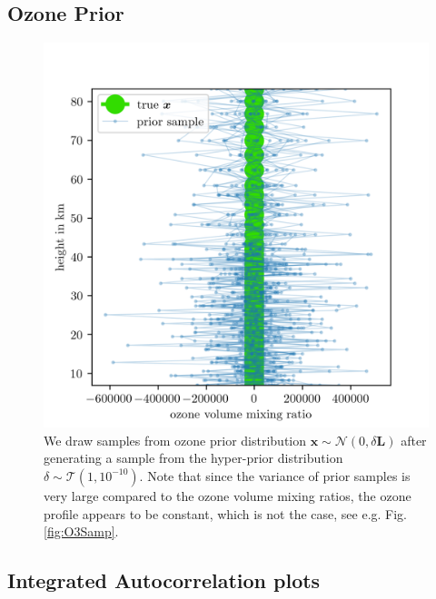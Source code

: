 \subsection{Ozone Prior}
\begin{figure}[ht!]
	\centering
	\includegraphics{OzonePrior.png}
	\caption[Samples from ozone prior distribution.]{We draw samples from ozone prior distribution $\bm{x} \sim \mathcal{N}(0,\delta \bm{L})$ after generating a sample from the hyper-prior distribution $\delta \sim \mathcal{T}(1,10^{-10})$. Note that since the variance of prior samples is very large compared to the ozone volume mixing ratios, the ozone profile appears to be constant, which is not the case, see e.g. Fig. \ref{fig:O3Samp}.}
	\label{fig:O3Prior}
\end{figure}


\subsection{Integrated Autocorrelation plots} 

